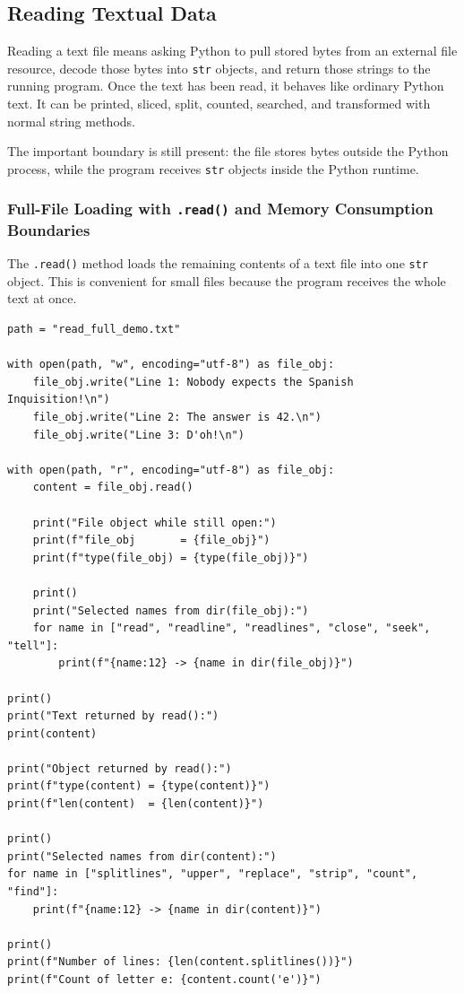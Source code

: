 \subsection{Reading Textual Data}

Reading a text file means asking Python to pull stored bytes from an external file resource, decode those bytes into \texttt{str} objects, and return those strings to the running program. Once the text has been read, it behaves like ordinary Python text. It can be printed, sliced, split, counted, searched, and transformed with normal string methods.

The important boundary is still present: the file stores bytes outside the Python process, while the program receives \texttt{str} objects inside the Python runtime.

\subsubsection{Full-File Loading with \texttt{.read()} and Memory Consumption Boundaries}

The \texttt{.read()} method loads the remaining contents of a text file into one \texttt{str} object. This is convenient for small files because the program receives the whole text at once.

\begin{verbatim}
path = "read_full_demo.txt"

with open(path, "w", encoding="utf-8") as file_obj:
    file_obj.write("Line 1: Nobody expects the Spanish Inquisition!\n")
    file_obj.write("Line 2: The answer is 42.\n")
    file_obj.write("Line 3: D'oh!\n")

with open(path, "r", encoding="utf-8") as file_obj:
    content = file_obj.read()

    print("File object while still open:")
    print(f"file_obj       = {file_obj}")
    print(f"type(file_obj) = {type(file_obj)}")

    print()
    print("Selected names from dir(file_obj):")
    for name in ["read", "readline", "readlines", "close", "seek", "tell"]:
        print(f"{name:12} -> {name in dir(file_obj)}")

print()
print("Text returned by read():")
print(content)

print("Object returned by read():")
print(f"type(content) = {type(content)}")
print(f"len(content)  = {len(content)}")

print()
print("Selected names from dir(content):")
for name in ["splitlines", "upper", "replace", "strip", "count", "find"]:
    print(f"{name:12} -> {name in dir(content)}")

print()
print(f"Number of lines: {len(content.splitlines())}")
print(f"Count of letter e: {content.count('e')}")
\end{verbatim}

